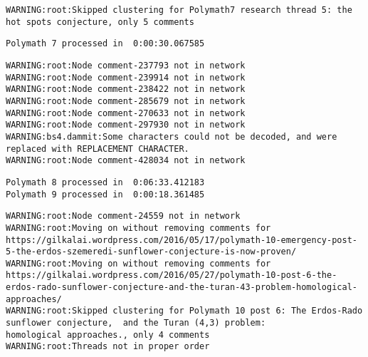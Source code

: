 \documentclass[article, floatfix, groupaddress, prb]{revtex4-1}
\begin{document}
    \begin{Verbatim}[commandchars=\\\{\}]
WARNING:root:Skipped clustering for Polymath7 research thread 5: the hot spots conjecture, only 5 comments

    \end{Verbatim}

    \begin{Verbatim}[commandchars=\\\{\}]
Polymath 7 processed in  0:00:30.067585

    \end{Verbatim}

    \begin{Verbatim}[commandchars=\\\{\}]
WARNING:root:Node comment-237793 not in network
WARNING:root:Node comment-239914 not in network
WARNING:root:Node comment-238422 not in network
WARNING:root:Node comment-285679 not in network
WARNING:root:Node comment-270633 not in network
WARNING:root:Node comment-297930 not in network
WARNING:bs4.dammit:Some characters could not be decoded, and were replaced with REPLACEMENT CHARACTER.
WARNING:root:Node comment-428034 not in network

    \end{Verbatim}

    \begin{Verbatim}[commandchars=\\\{\}]
Polymath 8 processed in  0:06:33.412183
Polymath 9 processed in  0:00:18.361485

    \end{Verbatim}

    \begin{Verbatim}[commandchars=\\\{\}]
WARNING:root:Node comment-24559 not in network
WARNING:root:Moving on without removing comments for https://gilkalai.wordpress.com/2016/05/17/polymath-10-emergency-post-5-the-erdos-szemeredi-sunflower-conjecture-is-now-proven/
WARNING:root:Moving on without removing comments for https://gilkalai.wordpress.com/2016/05/27/polymath-10-post-6-the-erdos-rado-sunflower-conjecture-and-the-turan-43-problem-homological-approaches/
WARNING:root:Skipped clustering for Polymath 10 post 6: The Erdos-Rado sunflower conjecture,  and the Turan (4,3) problem: homological approaches., only 4 comments
WARNING:root:Threads not in proper order

    \end{Verbatim}
\end{document}
